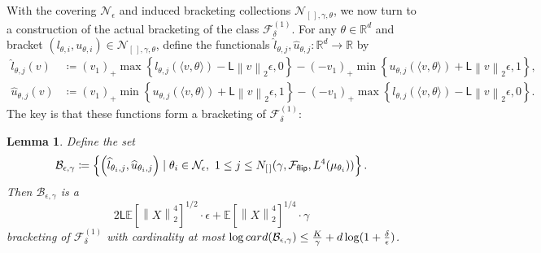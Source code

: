 \documentclass[11pt]{article}
\newcommand{\E}{\mathbb{E}}
\newcommand{\R}{\mathbb{R}} %
\newcommand{\mc}[1]{\mathcal{#1}}
\newcommand{\norm}[1]{\left\|{#1}\right\|} %
\newcommand{\what}[1]{\widehat{#1}}
\newcommand{\lipconst}{\mathsf{L}}
\newcommand{\ltwo}[1]{\norm{#1}_2} %
\newcommand{\<}{\langle} %
\renewcommand{\>}{\rangle}
\newcommand{\defeq}{\coloneqq}
\newcommand{\card}{\textup{card}}
\newcommand{\hinge}[1]{\left({#1}\right)_+}
\newtheorem{lemma}[claim]{Lemma}
\begin{document}
With the covering $\mc{N}_\epsilon$ and induced bracketing collections
$\mc{N}_{[\,],\gamma,\theta}$, we now turn to a construction of the
actual bracketing of the class $\mc{F}_\delta^{(1)}$.
For any $\theta \in \R^d$ and bracket $(l_{\theta,i},
u_{\theta, i}) \in \mathcal{N}_{[\,], \gamma, \theta}$, define
the functionals $\what{l}_{\theta,j}, \what{u}_{\theta,j} : \R^d \to \R$ by
\begin{align*}
	\what{l}_{\theta, j}(v)
	& \defeq \hinge{v_1}
	\max\left\{l_{\theta,j}(\<v, \theta\>) - \mathsf{L} \ltwo{v} \epsilon,
	0 \right\}
	- \hinge{-v_1} \min\left\{u_{\theta, j}(\<v, \theta\>) + \mathsf{L} \ltwo{v} \epsilon, 1
	\right\}  , \\
	\what{u}_{\theta, j}(v)
	& \defeq \hinge{v_1} \min\left\{u_{\theta, j}(\<v, \theta\>)
	+ \lipconst \ltwo{v} \epsilon, 1 \right\}
	- \hinge{-v_1} \max\left\{l_{\theta, j}(\<v, \theta\>) -
	\lipconst \ltwo{v} \epsilon, 0 \right\}.
\end{align*}
The key is that these functions form a bracketing
of $\mc{F}_\delta^{(1)}$:
\begin{lemma}
	\label{lemma:bracketing-construction}
	Define the set
	\begin{equation*}
		\mc{B}_{\epsilon,\gamma}
		\defeq
		\left\{ \left(\what{l}_{\theta_i, j},
		\what{u}_{\theta_i, j}\right)
		\mid
		\theta_i \in \mc{N}_\epsilon,
		~ 1 \le j \le N_{[\,]}(\gamma, \Fflip, L^4(\mu_{\theta_i}))\right\}.
	\end{equation*}
	Then
	$\mc{B}_{\epsilon,\gamma}$ is a
	\begin{equation*}
		2 \lipconst \E[\ltwo{X}^4]^{1/2} \cdot \epsilon
		+ \E[\ltwo{X}^4]^{1/4} \cdot \gamma
	\end{equation*}
	bracketing
	of $\mc{F}_\delta^{(1)}$ with cardinality
	at most
	$\log \card(\mc{B}_{\epsilon,\gamma})
	\le \frac{K}{\gamma} + d \log(1 + \frac{\delta}{\epsilon})$.
\end{lemma}
\end{document}
